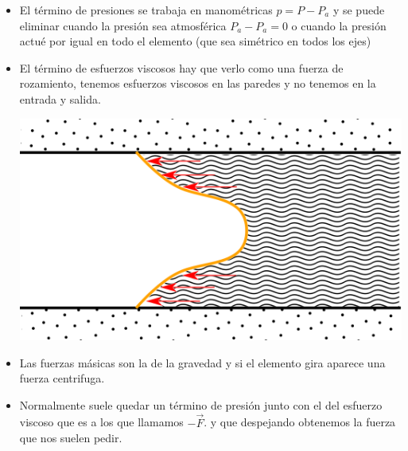 \documentclass[10pt,a4paper]{article}
\begin{document}
\begin{itemize}
        \item El término de presiones se trabaja en manométricas $p = P - P_a$ y se puede eliminar cuando la presión sea atmosférica $P_a - P_a = 0$ o cuando la presión actué por igual en todo el elemento (que sea simétrico en todos los ejes)
        
        \item El término de esfuerzos viscosos hay que verlo como una fuerza de rozamiento, tenemos esfuerzos viscosos en las paredes y no tenemos en la entrada y salida.
        \begin{center}
            \includegraphics[scale = 0.4]{path1339.png}
        \end{center}
        
        \item Las fuerzas másicas son la de la gravedad y si el elemento gira aparece una fuerza centrifuga.
        
        \item Normalmente suele quedar un término de presión junto con el del esfuerzo viscoso que es a los que llamamos $-\vec{F}$. y que despejando obtenemos la fuerza que nos suelen pedir.
        
        
    \end{itemize}
    
\end{document}
